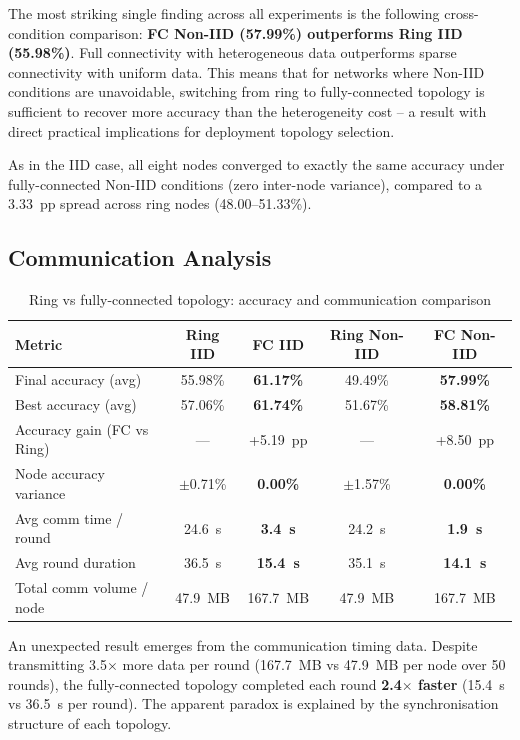 \documentclass[12pt]{report}
\begin{document}
The most striking single finding across all experiments is the following
cross-condition comparison: \textbf{FC Non-IID (57.99\%) outperforms Ring IID
(55.98\%)}. Full connectivity with heterogeneous data outperforms sparse connectivity
with uniform data. This means that for networks where Non-IID conditions are
unavoidable, switching from ring to fully-connected topology is sufficient to
recover more accuracy than the heterogeneity cost -- a result with direct
practical implications for deployment topology selection.

As in the IID case, all eight nodes converged to exactly the same accuracy
under fully-connected Non-IID conditions (zero inter-node variance), compared
to a 3.33~pp spread across ring nodes (48.00--51.33\%).

\subsection{Communication Analysis}

\begin{table}[H]
\centering
\begin{tabular}{lcccc}
\toprule
\textbf{Metric} & \textbf{Ring IID} & \textbf{FC IID} & \textbf{Ring Non-IID} & \textbf{FC Non-IID} \\
\midrule
Final accuracy (avg)      & 55.98\%  & \textbf{61.17\%} & 49.49\%  & \textbf{57.99\%} \\
Best accuracy (avg)       & 57.06\%  & \textbf{61.74\%} & 51.67\%  & \textbf{58.81\%} \\
Accuracy gain (FC vs Ring)& ---      & +5.19~pp         & ---      & +8.50~pp \\
Node accuracy variance    & $\pm$0.71\% & \textbf{0.00\%} & $\pm$1.57\% & \textbf{0.00\%} \\
Avg comm time / round     & 24.6~s   & \textbf{3.4~s}  & 24.2~s   & \textbf{1.9~s} \\
Avg round duration        & 36.5~s   & \textbf{15.4~s} & 35.1~s   & \textbf{14.1~s} \\
Total comm volume / node  & 47.9~MB  & 167.7~MB        & 47.9~MB  & 167.7~MB \\
\bottomrule
\end{tabular}
\vspace{0.5cm}
\caption{Ring vs fully-connected topology: accuracy and communication comparison}
\label{tab:topology-comparison}
\end{table}

An unexpected result emerges from the communication timing data. Despite
transmitting 3.5$\times$ more data per round (167.7~MB vs 47.9~MB per node
over 50 rounds), the fully-connected topology completed each round
\textbf{2.4$\times$ faster} (15.4~s vs 36.5~s per round). The apparent
paradox is explained by the synchronisation structure of each topology.
\end{document}
